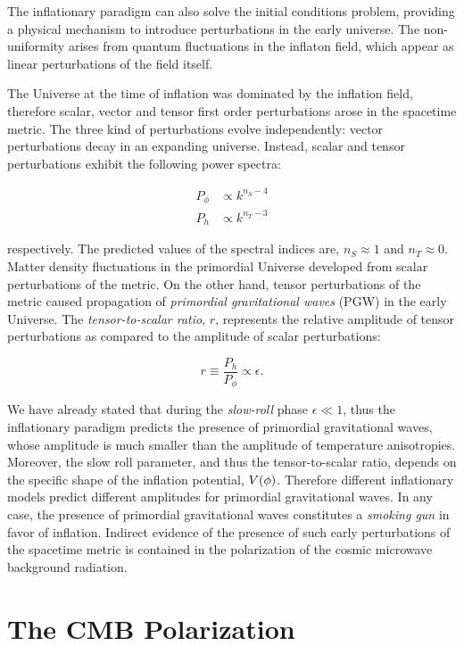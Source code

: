 The inflationary paradigm can also solve the initial conditions problem,
providing a physical mechanism to introduce perturbations in the early
universe. The non-uniformity arises from quantum fluctuations in the
inflaton field, which appear as linear perturbations of the field itself.

The Universe at the time of inflation was dominated by the inflation field,
therefore scalar, vector and tensor first order perturbations arose in
the spacetime metric. The three kind of perturbations evolve independently:
vector perturbations decay in an expanding universe. Instead, scalar and
tensor perturbations exhibit the following power spectra:

\begin{align}
        P_\phi & \propto k^{n_S - 4} \\
        P_h & \propto k^{n_T - 3}
\end{align}

respectively. The predicted values of the spectral
indices are, $n_S \approx 1$ and $n_T \approx 0$.
Matter density fluctuations in the primordial Universe developed from
scalar perturbations of the metric. On the other hand, tensor perturbations
of the metric caused propagation of \emph{primordial gravitational waves}
(PGW) in the early Universe. The \emph{tensor-to-scalar ratio}, $r$, represents
the relative amplitude of tensor perturbations as compared to the amplitude
of scalar perturbations:

\begin{equation}
        r \equiv \frac{P_h}{P_\phi} \propto \epsilon.
\end{equation}

We have already stated that during the \emph{slow-roll} phase $\epsilon \ll
1$, thus the inflationary paradigm predicts the presence of primordial
gravitational waves, whose amplitude is much smaller than the amplitude of
temperature anisotropies. Moreover, the slow roll parameter, and thus the
tensor-to-scalar ratio, depends on the specific shape of the inflation
potential, $V\qty(\phi)$. Therefore different inflationary models predict
different amplitudes for primordial gravitational waves. In any case, the
presence of primordial gravitational waves constitutes a \emph{smoking gun} in favor
of inflation. Indirect evidence of the presence of such early perturbations of
the spacetime metric is contained in the polarization of the cosmic microwave
background radiation.

\section{The CMB Polarization}

